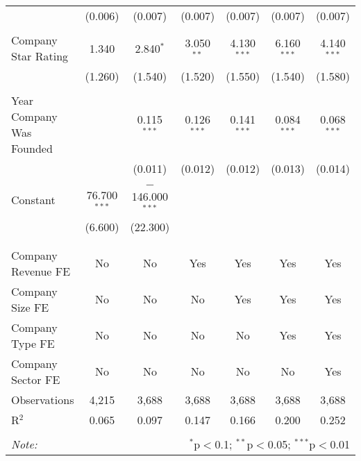 \begin{table}[!htbp]
\begin{tabular}{@{\extracolsep{5pt}}lcccccc}
  & (0.006) & (0.007) & (0.007) & (0.007) & (0.007) & (0.007) \\ 
  & & & & & & \\ 
 Company Star Rating & 1.340 & 2.840$^{*}$ & 3.050$^{**}$ & 4.130$^{***}$ & 6.160$^{***}$ & 4.140$^{***}$ \\ 
  & (1.260) & (1.540) & (1.520) & (1.550) & (1.540) & (1.580) \\ 
  & & & & & & \\ 
 Year Company Was Founded &  & 0.115$^{***}$ & 0.126$^{***}$ & 0.141$^{***}$ & 0.084$^{***}$ & 0.068$^{***}$ \\ 
  &  & (0.011) & (0.012) & (0.012) & (0.013) & (0.014) \\ 
  & & & & & & \\ 
 Constant & 76.700$^{***}$ & $-$146.000$^{***}$ &  &  &  &  \\ 
  & (6.600) & (22.300) &  &  &  &  \\ 
  & & & & & & \\ 
\hline \\[-1.8ex] 
Company Revenue FE & No & No & Yes & Yes & Yes & Yes \\ 
Company Size FE & No & No & No & Yes & Yes & Yes \\ 
Company Type FE & No & No & No & No & Yes & Yes \\ 
Company Sector FE & No & No & No & No & No & Yes \\ 
Observations & 4,215 & 3,688 & 3,688 & 3,688 & 3,688 & 3,688 \\ 
R$^{2}$ & 0.065 & 0.097 & 0.147 & 0.166 & 0.200 & 0.252 \\ 
\hline 
\hline \\[-1.8ex] 
\textit{Note:}  & \multicolumn{6}{r}{$^{*}$p$<$0.1; $^{**}$p$<$0.05; $^{***}$p$<$0.01} \\ 
\end{tabular} 
\end{table} 
